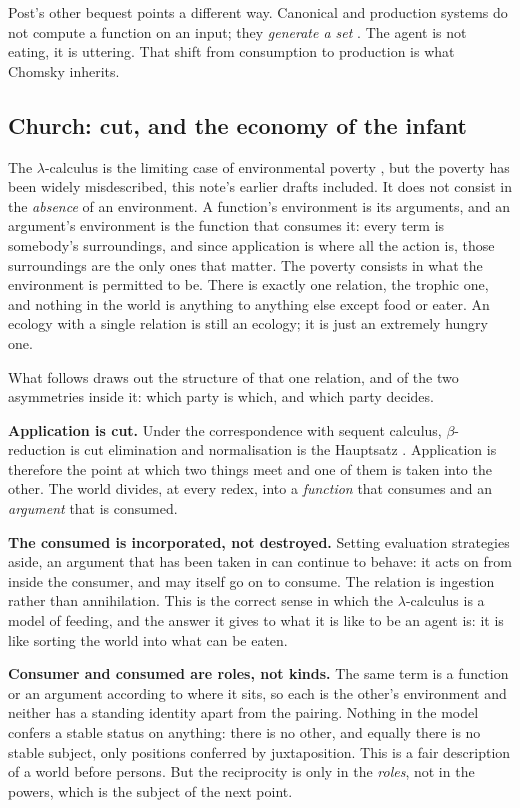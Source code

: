 \documentclass[11pt,a4paper]{article}
\begin{document}
Post's other bequest points a different way. Canonical and production systems do
not compute a function on an input; they \emph{generate a set}
\cite{post1943}. The agent is not eating, it is uttering. That shift from
consumption to production is what Chomsky inherits.

\subsection{Church: cut, and the economy of the infant}
\label{sec:church}

The $\lambda$-calculus is the limiting case of environmental poverty
\cite{church1936}, but the poverty has been widely misdescribed, this note's
earlier drafts included. It does not consist in the \emph{absence} of an
environment. A function's environment is its arguments, and an argument's
environment is the function that consumes it: every term is somebody's
surroundings, and since application is where all the action is, those
surroundings are the only ones that matter. The poverty consists in what the
environment is permitted to be. There is exactly one relation, the trophic one,
and nothing in the world is anything to anything else except food or eater. An
ecology with a single relation is still an ecology; it is just an extremely
hungry one.

What follows draws out the structure of that one relation, and of the two
asymmetries inside it: which party is which, and which party decides.

\textbf{Application is cut.} Under the correspondence with sequent calculus,
$\beta$-reduction is cut elimination and normalisation is the Hauptsatz
\cite{gentzen1935,howard1980}. Application is therefore the point at which two
things meet and one of them is taken into the other. The world divides, at every
redex, into a \emph{function} that consumes and an \emph{argument} that is
consumed.

\textbf{The consumed is incorporated, not destroyed.} Setting evaluation
strategies aside, an argument that has been taken in can continue to behave: it
acts on from inside the consumer, and may itself go on to consume. The relation is
ingestion rather than annihilation. This is the correct sense in which the
$\lambda$-calculus is a model of feeding, and the answer it gives to what it is
like to be an agent is: it is like sorting the world into what can be eaten.

\textbf{Consumer and consumed are roles, not kinds.} The same term is a function
or an argument according to where it sits, so each is the other's environment and
neither has a standing identity apart from the pairing. Nothing in the model
confers a stable status on anything: there is no other, and equally there is no
stable subject, only positions conferred by juxtaposition. This is a fair
description of a world before persons. But the reciprocity is only in the
\emph{roles}, not in the powers, which is the subject of the next point.
\end{document}
